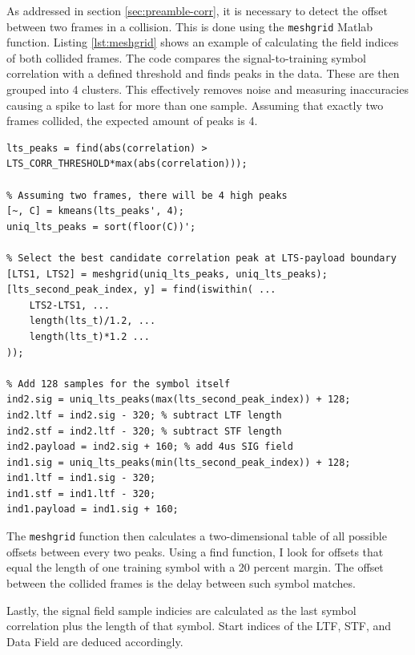 As addressed in section \ref{sec:preamble-corr}, it is necessary to detect the offset between two frames in a collision. This is done using the \texttt{meshgrid} Matlab function. Listing \ref{lst:meshgrid} shows an example of calculating the field indices of both collided frames. The code compares the signal-to-training symbol correlation with a defined threshold and finds peaks in the data. These are then grouped into 4 clusters. This effectively removes noise and measuring inaccuracies causing a spike to last for more than one sample. Assuming that exactly two frames collided, the expected amount of peaks is 4.

\begin{lstlisting}[captionpos=b,caption={Collision Offset Detection using Meshgrid},label=lst:meshgrid]
% Find peaks above a parametrized threshold
lts_peaks = find(abs(correlation) > LTS_CORR_THRESHOLD*max(abs(correlation)));

% Assuming two frames, there will be 4 high peaks
[~, C] = kmeans(lts_peaks', 4);
uniq_lts_peaks = sort(floor(C))';

% Select the best candidate correlation peak at LTS-payload boundary
[LTS1, LTS2] = meshgrid(uniq_lts_peaks, uniq_lts_peaks);
[lts_second_peak_index, y] = find(iswithin( ...
    LTS2-LTS1, ...
    length(lts_t)/1.2, ...
    length(lts_t)*1.2 ...
));

% Add 128 samples for the symbol itself
ind2.sig = uniq_lts_peaks(max(lts_second_peak_index)) + 128;
ind2.ltf = ind2.sig - 320; % subtract LTF length
ind2.stf = ind2.ltf - 320; % subtract STF length
ind2.payload = ind2.sig + 160; % add 4us SIG field
ind1.sig = uniq_lts_peaks(min(lts_second_peak_index)) + 128;
ind1.ltf = ind1.sig - 320;
ind1.stf = ind1.ltf - 320;
ind1.payload = ind1.sig + 160;
\end{lstlisting}

The \texttt{meshgrid} function then calculates a two-dimensional table of all possible offsets between every two peaks. Using a find function, I look for offsets that equal the length of one training symbol with a 20 percent margin.  The offset between the collided frames is the delay between such symbol matches.

Lastly, the signal field sample indicies are calculated as the last symbol correlation plus the length of that symbol. Start indices of the \gls{LTF}, \gls{STF}, and Data Field are deduced accordingly.

